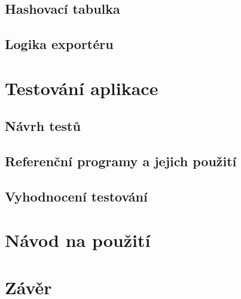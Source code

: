 \documentclass[11pt, a4paper, hidelinks]{article}[08.10.2023]
\begin{document}
    \subsection{Hashovací tabulka}
    \subsection{Logika exportéru}

    \section{Testování aplikace}
    \subsection{Návrh testů}
    \subsection{Referenční programy a jejich použití}
    \subsection{Vyhodnocení testování}

    \section{Návod na použití}

    \section{Závěr}

    \pagebreak

    
    
\end{document}
